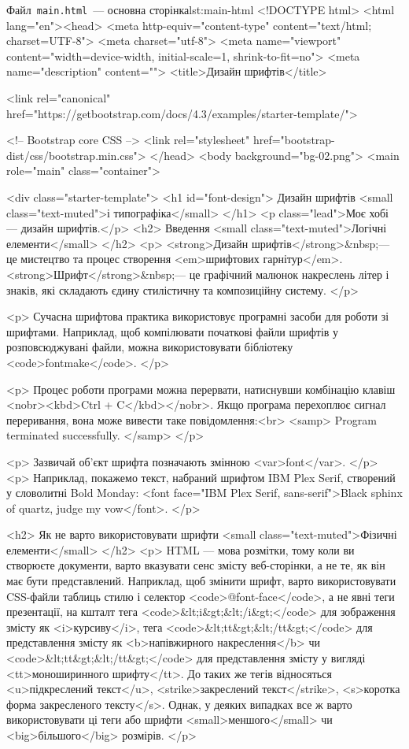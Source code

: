 \documentclass[
  a4paper,
  oneside,
  BCOR = 10mm,
  DIV = 12,
  12pt,
  headings = normal,
]{scrartcl}
\newcommand{\filename}[1]{\texttt{#1}}
\begin{document}
    \begin{listinghtml}{Файл~\filename{\textenglish{main.html}}~— основна сторінка}{lst:main-html}
<!DOCTYPE html>
<html lang="en"><head>
<meta http-equiv="content-type" content="text/html; charset=UTF-8">
    <meta charset="utf-8">
    <meta name="viewport" content="width=device-width, initial-scale=1, shrink-to-fit=no">
    <meta name="description" content="">
    <title>Дизайн шрифтів</title>

    <link rel="canonical" href="https://getbootstrap.com/docs/4.3/examples/starter-template/">

    <!-- Bootstrap core CSS -->
    <link rel="stylesheet" href="bootstrap-dist/css/bootstrap.min.css">
  </head>
  <body background="bg-02.png">
<main role="main" class="container">

  <div class="starter-template">
    <h1 id="font-design">
      Дизайн шрифтів
      <small class="text-muted">і типографіка</small>
    </h1>
    <p class="lead">Моє хобі — дизайн шрифтів.</p>
    <h2>
      Введення
      <small class="text-muted">Логічні елементи</small>
    </h2>
    <p>
      <strong>Дизайн шрифтів</strong>&nbsp;— це мистецтво та процес створення <em>шрифтових гарнітур</em>. <strong>Шрифт</strong>&nbsp;— це графічний малюнок накреслень літер і знаків, які складають єдину стилістичну та композиційну систему.
    </p>

    <p>
      Сучасна шрифтова практика використовує програмні засоби для роботи зі шрифтами. Наприклад, щоб компілювати початкові файли шрифтів у розповсюджувані файли, можна використовувати бібліотеку <code>fontmake</code>.
    </p>

    <p>
    Процес роботи програми можна перервати, натиснувши комбінацію клавіш <nobr><kbd>Ctrl + C</kbd></nobr>. Якщо програма перехоплює сигнал переривання, вона може вивести таке повідомлення:<br>
      <samp>
        Program terminated successfully.
      </samp>
    </p>

    <p>
      Зазвичай об'єкт шрифта позначають змінною <var>font</var>.
    </p>
    <p>
      Наприклад, покажемо текст, набраний шрифтом IBM Plex Serif, створений у словолитні Bold Monday: <font face="IBM Plex Serif, sans-serif">Black sphinx of quartz, judge my vow</font>.
    </p>

    <h2>
      Як не варто використовувати шрифти
      <small class="text-muted">Фізичні елементи</small>
    </h2>
      <p>
        HTML — мова розмітки, тому коли ви створюєте документи, варто вказувати сенс змісту веб-сторінки, а не те, як він має бути представлений. Наприклад, щоб змінити шрифт, варто використовувати CSS-файли таблиць стилю і селектор <code>@font-face</code>, а не явні теги презентації, на кшталт тега <code>&lt;i&gt;&lt;/i&gt;</code> для зображення змісту як <i>курсиву</i>, тега <code>&lt;tt&gt;&lt;/tt&gt;</code> для представлення змісту як <b>напівжирного накреслення</b> чи <code>&lt;tt&gt;&lt;/tt&gt;</code> для представлення змісту у вигляді <tt>моноширинного шрифту</tt>. До таких же тегів відносяться <u>підкреслений текст</u>, <strike>закреслений текст</strike>, <s>коротка форма закресленого тексту</s>. Однак, у деяких випадках все ж варто використовувати ці теги або шрифти <small>меншого</small> чи <big>більшого</big> розмірів.
      </p>


\end{listinghtml}
\end{document}
